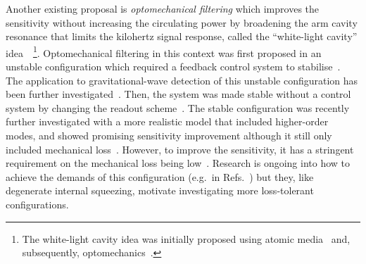Another existing proposal is \emph{optomechanical filtering} which improves the sensitivity without increasing the circulating power by broadening the arm cavity resonance that limits the kilohertz signal response, called the ``white-light cavity'' idea~\cite{miaoEnhancingBandwidthGravitationalWave2015}~\footnote{The white-light cavity idea was initially proposed using atomic media~\cite{WICHT1997431} and, subsequently, optomechanics~\cite{Qin:15}.}. %
Optomechanical filtering in this context was first proposed in an unstable configuration which required a feedback control system to stabilise~\cite{miaoEnhancingBandwidthGravitationalWave2015}. %
The application to gravitational-wave detection of this unstable configuration has been further investigated~\cite{miaoDesignGravitationalWaveDetectors2018}. 
Then, the system was made stable without a control system by changing the readout scheme~\cite{liBroadbandSensitivityImprovement2020}. The stable configuration was recently further investigated with a more realistic model that included higher-order modes, and showed promising sensitivity improvement although it still only included mechanical loss~\cite{liEnhancingInterferometerSensitivity2021}. 
However, to improve the sensitivity, it has a stringent requirement on the mechanical loss being low~\cite{miaoEnhancingBandwidthGravitationalWave2015,liBroadbandSensitivityImprovement2020}. Research is ongoing into how to achieve the demands of this configuration (e.g.\ in Refs.~\cite{ying_2020,pageEnhancedDetectionHigh2018}) but they, like degenerate internal squeezing, motivate investigating more loss-tolerant configurations. 

